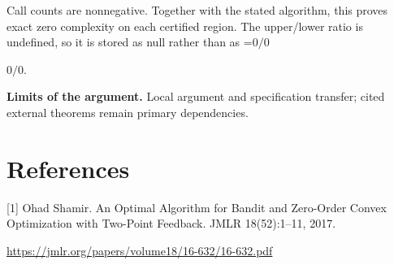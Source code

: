 \documentclass[10pt,a4paper]{article}
\newcommand{\AtlasMath}[1]{\par\begingroup\centering\setbox0=\hbox{$\displaystyle #1$}\ifdim\wd0>1.4\linewidth\typeout{ATLAS WIDE FORMULA: \the\wd0}\fi\ifdim\wd0>\linewidth\resizebox{\linewidth}{!}{\box0}\else\box0\fi\par\endgroup}
\newcommand{\AtlasInlineMath}[1]{\begingroup\setbox0=\hbox{$#1$}\ifdim\wd0>.4\linewidth\endgroup\AtlasMath{#1}\else\endgroup$#1$\fi}
\begin{document}
Call counts are nonnegative. Together with the stated algorithm, this proves exact zero complexity on each certified region. The upper/lower ratio is undefined, so it is stored as null rather than as \AtlasInlineMath{0/0}.

\textbf{Limits of the argument.} Local argument and specification transfer; cited external theorems remain primary dependencies.

\section{References}
[1] Ohad Shamir. An Optimal Algorithm for Bandit and Zero-Order Convex Optimization with Two-Point Feedback. JMLR 18(52):1--11, 2017.

\url{https://jmlr.org/papers/volume18/16-632/16-632.pdf}
\end{document}
